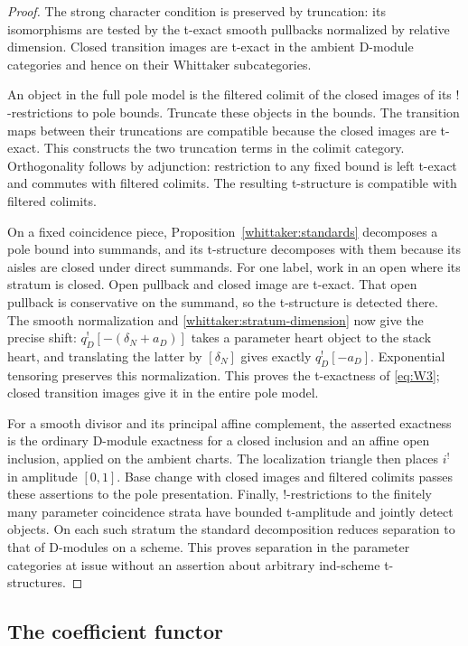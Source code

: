 \documentclass[11pt]{article}
\numberwithin{equation}{section}
\theoremstyle{definition}
\theoremstyle{remark}
\begin{document}
\begin{proof}
The strong character condition is preserved by truncation: its
isomorphisms are tested by the t-exact smooth pullbacks normalized by
relative dimension. Closed transition images are t-exact in the ambient
D-module categories and hence on their Whittaker subcategories.

An object in the full pole model is the filtered colimit of the closed
images of its $!$-restrictions to pole bounds. Truncate these objects in
the bounds. The transition maps between their truncations are compatible
because the closed images are t-exact. This constructs the two
truncation terms in the colimit category. Orthogonality follows by
adjunction: restriction to any fixed bound is left t-exact and commutes
with filtered colimits. The resulting t-structure is compatible with
filtered colimits.

On a fixed coincidence piece, Proposition~\ref{whittaker:standards}
decomposes a pole bound into summands, and its t-structure decomposes
with them because its aisles are closed under direct summands. For one
label, work in an open where its stratum is closed. Open pullback and
closed image are t-exact. That open pullback is conservative on the
summand, so the t-structure is detected there. The smooth normalization
and \eqref{whittaker:stratum-dimension} now give the precise shift:
$q_D^![-(\delta_N+a_D)]$ takes a parameter heart object to the stack
heart, and translating the latter by $[\delta_N]$ gives exactly
$q_D^![-a_D]$. Exponential tensoring preserves this normalization. This
proves the t-exactness of \eqref{eq:W3}; closed transition images give it
in the entire pole model.

For a smooth divisor and its principal affine complement, the asserted
exactness is the ordinary D-module exactness for a closed inclusion and
an affine open inclusion, applied on the ambient charts. The localization
triangle then places $i^!$ in amplitude $[0,1]$. Base change with closed
images and filtered colimits passes these assertions to the pole
presentation. Finally, $!$-restrictions to the finitely many parameter
coincidence strata have bounded t-amplitude and jointly detect objects.
On each such stratum the standard decomposition reduces separation to
that of D-modules on a scheme. This proves separation in the parameter
categories at issue without an assertion about arbitrary ind-scheme
t-structures.
\end{proof}

\subsection{The coefficient functor}
\end{document}
